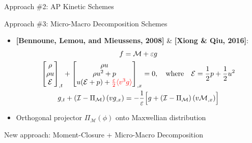 \documentclass[final,hyperref={pdfpagelabels=false}]{beamer}
\newcommand{\inred}[1]
        {\mbox{\color{red} #1}}
\newcommand{\M}{\mathcal M}
\newcommand{\En}{\mathcal E}
\begin{document}
\begin{frame}[t]
\begin{columns}[t]
\begin{column}{.31\textwidth}
\begin{block}{Approach \#2: AP Kinetic Schemes}
\end{block}

\begin{block}{Approach \#3: Micro-Macro Decomposition Schemes}


\begin{itemize}
\item {\bf [Bennoune, Lemou, and Mieussens, 2008]} \& 
{\bf [Xiong \& Qiu, 2016]}:
\begin{gather*}
   f = \M + \varepsilon g \\
 \begin{bmatrix} \rho \\ \rho u \\ {\mathcal E} \end{bmatrix}_{,t} +
	 \begin{bmatrix} \rho u \\ \rho u^2 + p \\ u ({\mathcal E}+p) 
	 + \inred{$\frac{\varepsilon}{2} \langle v^3 g \rangle$} \end{bmatrix}_{,x} = 0, \quad \text{where} \quad
	 \En = \frac{1}{2} p + \frac{1}{2} u^2 \\
g_{,t} + \left( {\mathcal I} - 
\Pi_{\M} \right)\left( v g_{,x} \right) = -\frac{1}{\varepsilon} \Bigl[ 
g + \left( {\mathcal I} - 
\Pi_{\M} \right)\left( v \M_{,x} \right) \Bigr]
\end{gather*}

\item Orthogonal projector $\Pi_{\M} (\phi)$ onto Maxwellian distribution

\end{itemize}
     
\end{block}

\begin{block}{New approach: Moment-Closure + Micro-Macro Decomposition}



\end{block}
\end{column}
\end{columns}
\end{frame}
\end{document}
